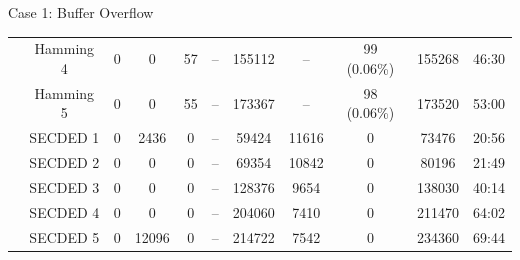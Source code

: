 \begin{frame}[noframenumbering]{Case 1: Buffer Overflow}
\begin{table}[H]
\begin{tabular}{@{}ccccccccccc@{}}
                                                               & Hamming 4     & 0     & 0           & 57         & --          & \num{155112}                             & --                                      & 99  {\tiny (0.06\%)}        & \num{155268} & 46:30                                   \\
                                                               & Hamming 5     & 0     & 0           & 55         & --          & \num{173367}                             & --                                      & 98  {\tiny (0.06\%)}        & \num{173520} & 53:00                                   \\
                                                               & SECDED 1      & 0     & 2436        & 0          & --          & \num{59424 }                             & \num{11616}                             & 0                           & \num{73476 } & 20:56                                   \\
                                                               & SECDED 2      & 0     & 0           & 0          & --          & \num{69354 }                             & \num{10842}                             & 0                           & \num{80196 } & 21:49                                   \\
                                                               & SECDED 3      & 0     & 0           & 0          & --          & \num{128376}                             & \num{9654 }                             & 0                           & \num{138030} & 40:14                                   \\
                                                               & SECDED 4      & 0     & 0           & 0          & --          & \num{204060}                             & \num{7410 }                             & 0                           & \num{211470} & 64:02                                   \\
                                                               & SECDED 5      & 0     & \num{12096} & 0          & --          & \num{214722}                             & \num{7542 }                             & 0                           & \num{234360} & 69:44                                   \\
            \bottomrule
        \end{tabular}
    \end{table}
\end{frame}

